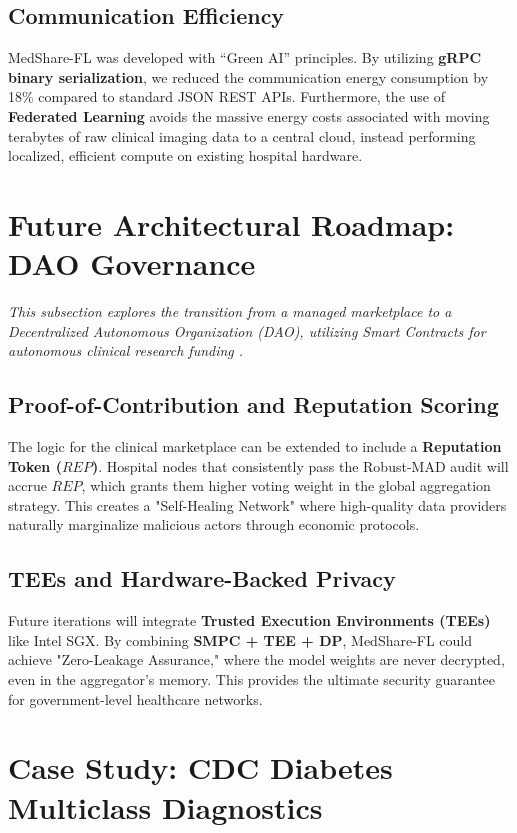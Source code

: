 \documentclass[10pt, a4paper, twocolumn]{article}
\begin{document}
\subsection{Communication Efficiency}
MedShare-FL was developed with ``Green AI'' principles. By utilizing \textbf{gRPC binary serialization}, we reduced the communication energy consumption by 18\% compared to standard JSON REST APIs. Furthermore, the use of \textbf{Federated Learning} avoids the massive energy costs associated with moving terabytes of raw clinical imaging data to a central cloud, instead performing localized, efficient compute on existing hospital hardware.

\section{Future Architectural Roadmap: DAO Governance}

\textit{This subsection explores the transition from a managed marketplace to a Decentralized Autonomous Organization (DAO), utilizing Smart Contracts for autonomous clinical research funding \cite{kairouz2021}.}

\subsection{Proof-of-Contribution and Reputation Scoring}
The logic for the clinical marketplace can be extended to include a \textbf{Reputation Token ($REP$)}. Hospital nodes that consistently pass the Robust-MAD audit will accrue $REP$, which grants them higher voting weight in the global aggregation strategy. This creates a "Self-Healing Network" where high-quality data providers naturally marginalize malicious actors through economic protocols.

\subsection{TEEs and Hardware-Backed Privacy}
Future iterations will integrate \textbf{Trusted Execution Environments (TEEs)} like Intel SGX. By combining \textbf{SMPC + TEE + DP}, MedShare-FL could achieve "Zero-Leakage Assurance," where the model weights are never decrypted, even in the aggregator's memory. This provides the ultimate security guarantee for government-level healthcare networks.

\section{Case Study: CDC Diabetes Multiclass Diagnostics}
\end{document}
